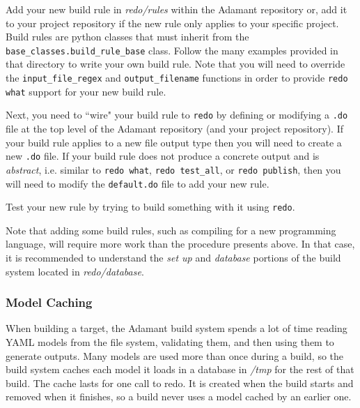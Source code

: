 \vspace{5mm} %
\begin{spacedenumerate}
  \item Add your new build rule in \textit{redo/rules} within the Adamant repository or, add it to your project repository if the new rule only applies to your specific project. Build rules are python classes that must inherit from the \texttt{base\_classes.build\_rule\_base} class. Follow the many examples provided in that directory to write your own build rule. Note that you will need to override the \texttt{input\_file\_regex} and \texttt{output\_filename} functions in order to provide \texttt{redo what} support for your new build rule.
  \item Next, you need to ``wire" your build rule to \texttt{redo} by defining or modifying a \texttt{.do} file at the top level of the Adamant repository (and your project repository). If your build rule applies to a new file output type then you will need to create a new \texttt{.do} file. If your build rule does not produce a concrete output and is \textit{abstract}, i.e. similar to \texttt{redo what}, \texttt{redo test\_all}, or \texttt{redo publish}, then you will need to modify the \texttt{default.do} file to add your new rule. 
  \item Test your new rule by trying to build something with it using \texttt{redo}.
\end{spacedenumerate}
\vspace{5mm} %

Note that adding some build rules, such as compiling for a new programming language, will require more work than the procedure presents above. In that case, it is recommended to understand the \textit{set up} and \textit{database} portions of the build system located in \textit{redo/database}.

\subsubsection{Model Caching} \label{The Model Cache}

When building a target, the Adamant build system spends a lot of time reading YAML models from the file system, validating them, and then using them to generate outputs. Many models are used more than once during a build, so the build system caches each model it loads in a database in \textit{/tmp} for the rest of that build. The cache lasts for one call to redo. It is created when the build starts and removed when it finishes, so a build never uses a model cached by an earlier one. \\

